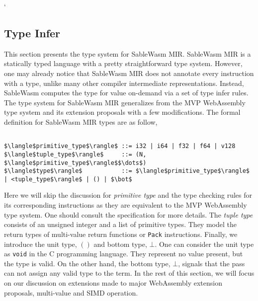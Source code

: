 `\subsection{Type Infer}

This section presents the type system for SableWasm MIR. SableWasm MIR is a statically typed language with a pretty straightforward type system. However, one may already notice that SableWasm MIR does not annotate every instruction with a type, unlike many other compiler intermediate representations. Instead, SableWasm computes the type for value on-demand via a set of type infer rules. The type system for SableWasm MIR generalizes from the MVP WebAssembly type system and its extension proposals with a few modifications. The formal definition for SableWasm MIR types are as follow,

\begin{lstlisting}[basicstyle=\linespread{1}\ttfamily, mathescape=true]

$\langle$primitive_type$\rangle$ ::= i32 | i64 | f32 | f64 | v128
$\langle$tuple_type$\rangle$     ::= (N, $\langle$primitive_type$\rangle$$\dots$)
$\langle$type$\rangle$           ::= $\langle$primitive_type$\rangle$ | <tuple_type$\rangle$ | () | $\bot$

\end{lstlisting}

Here we will skip the discussion for \emph{primitive type} and the type checking rules for its corresponding instructions as they are equivalent to the MVP WebAssembly type system. One should consult the specification for more details. The \emph{tuple type} consists of an unsigned integer and a list of primitive types. They model the return types of multi-value return functions or \texttt{Pack} instructions. Finally, we introduce the unit type, $()$ and bottom type, $\bot$. One can consider the unit type as \texttt{void} in the C programming language. They represent no value present, but the type is valid. On the other hand, the bottom type, $\bot$, signals that the pass can not assign any valid type to the term. In the rest of this section, we will focus on our discussion on extensions made to major WebAssembly extension proposals, multi-value and SIMD operation.

